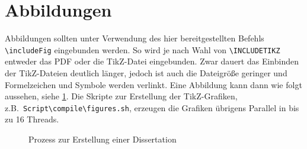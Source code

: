 \section{Abbildungen}
\label{sec:abbildungen}

Abbildungen sollten unter Verwendung des hier bereitgestellten Befehls \texttt{\textbackslash includeFig} eingebunden werden. So wird je nach Wahl von \texttt{\textbackslash INCLUDETIKZ} entweder das PDF oder die TikZ-Datei eingebunden. Zwar dauert das Einbinden der TikZ-Dateien deutlich länger, jedoch ist auch die Dateigröße geringer und Formelzeichen und Symbole werden verlinkt. Eine Abbildung kann dann wie folgt aussehen, siehe \cref{img:Dissertationsprozess}. Die Skripte zur Erstellung der TikZ-Grafiken, z.B.\ \texttt{Script\textbackslash{}compile\textbackslash{}figures.sh}, erzeugen die Grafiken übrigens Parallel in bis zu 16 Threads.


\begin{figure}[hbt]
	\centering
	\caption{Prozess zur Erstellung einer Dissertation}
	\label{img:Dissertationsprozess}
\end{figure}

